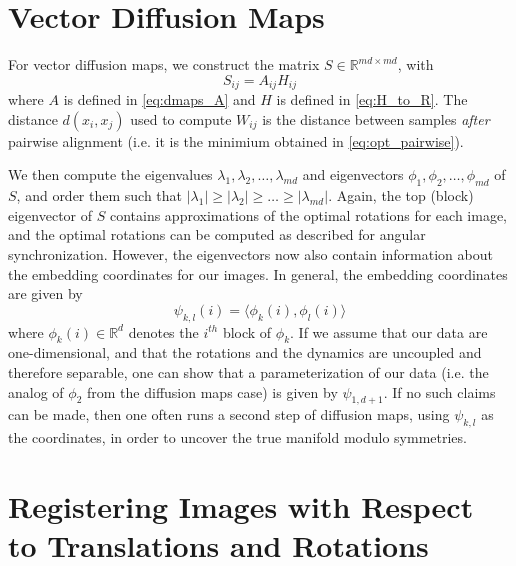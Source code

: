 \documentclass{pnastwo}
\begin{document}
\begin{article}
\begin{materials}
\section{Vector Diffusion Maps}

For vector diffusion maps, we construct the matrix $S \in \mathbb{R}^{md \times md}$, with
\begin{equation}
	S_{ij} = A_{ij} H_{ij}
\end{equation}
%
where $A$ is defined in \eqref{eq:dmaps_A} and $H$ is defined in \eqref{eq:H_to_R}.
%
The distance $d(x_i, x_j)$ used to compute $W_{ij}$ is the distance between samples {\em after} pairwise alignment (i.e. it is the minimium obtained in \eqref{eq:opt_pairwise}). 

We then compute the eigenvalues $\lambda_1, \lambda_2, \dots, \lambda_{md}$ and eigenvectors $\phi_1, \phi_2, \dots, \phi_{md}$ of $S$, and order them such that $|\lambda_1| \ge |\lambda_2| \ge \dots \ge |\lambda_{md}|$.
%
Again, the top (block) eigenvector of $S$ contains approximations of the optimal rotations for each image, and the optimal rotations can be computed as described for angular synchronization.
%
However, the eigenvectors now also contain information about the embedding coordinates for our images.
%
In general, the embedding coordinates are given by 
\begin{equation}
\psi_{k,l} (i) = \langle \phi_k(i), \phi_l(i) \rangle
\end{equation}
where $\phi_k(i) \in \mathbb{R}^d$ denotes the $i^{th}$ block of $\phi_k$.
%
If we assume that our data are one-dimensional, and that the rotations and the dynamics are uncoupled and therefore separable, one can show that a parameterization of our data (i.e. the analog of $\phi_2$ from the diffusion maps case) is given by $\psi_{1,d+1}$.
%
If no such claims can be made, then one often runs a second step of diffusion maps, using $\psi_{k,l}$ as the coordinates, in order to uncover the true manifold modulo symmetries. 

\section{Registering Images with Respect to Translations and Rotations} \label{subsec:trans_rot_register}


\end{materials}
\end{article}
\end{document}
